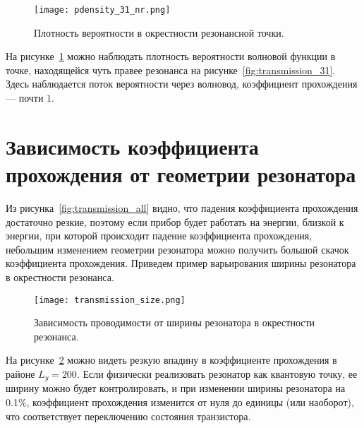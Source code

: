 \begin{figure}[H]
\texttt{[image: pdensity\_31\_nr.png]}
\caption{Плотность вероятности в окрестности резонансной точки.}
\label{fig:pdensity_31_nr}
\end{figure}
На рисунке~\ref{fig:pdensity_31_nr} можно наблюдать плотность вероятности волновой функции в точке, находящейся чуть правее резонанса на рисунке~\ref{fig:transmission_31}. Здесь наблюдается поток вероятности через волновод, коэффициент прохождения — почти $1$.

\section{Зависимость коэффициента прохождения от геометрии резонатора}
Из рисунка~\ref{fig:transmission_all} видно, что падения коэффициента прохождения достаточно резкие, поэтому если прибор будет работать на энергии, близкой к энергии, при которой происходит падение коэффициента прохождения, небольшим изменением геометрии резонатора можно получить большой скачок коэффициента прохождения. Приведем пример варьирования ширины резонатора в окрестности резонанса.

\begin{figure}[H]
\texttt{[image: transmission\_size.png]}
\caption{Зависимость проводимости от ширины резонатора в окрестности резонанса.}
\label{fig:transmission_size}
\end{figure}
На рисунке~\ref{fig:transmission_size} можно видеть резкую впадину в коэффициенте прохождения в районе $L_y = 200$. Если физически реализовать резонатор как квантовую точку, ее ширину можно будет контролировать, и при изменении ширины резонатора на 0.1\%, коэффициент прохождения изменится от нуля до единицы (или наоборот), что соответствует переключению состояния транзистора.

